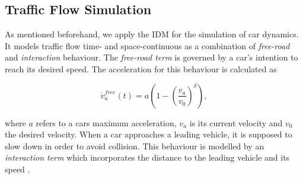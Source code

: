 \documentclass[10pt]{article}
\begin{document}
%
	
\subsection{Traffic Flow Simulation}

As mentioned beforehand, we apply the IDM \citep{treiber2000congested} for the simulation of car dynamics. It models traffic flow time- and space-continuous as a combination of \textit{free-road} and \textit{interaction} behaviour. The \textit{free-road term} is governed by a car's intention to reach its desired speed. The acceleration for this behaviour is calculated \citep{treiber2000congested} as

\begin{equation}
	\label{eq:free-road-term}
	\dot{v}_a^{free}(t) = a ( 1 - ( \frac{v_a}{v_0} )^\delta),
\end{equation}

where $a$ refers to a cars maximum acceleration, $v_a$ is its current velocity and $v_0$ the desired velocity. When a car approaches a leading vehicle, it is supposed to slow down in order to avoid collision. This behaviour is modelled by an \textit{interaction term} which incorporates the distance to the leading vehicle and its speed \citep{treiber2000congested}. 
\end{document}
